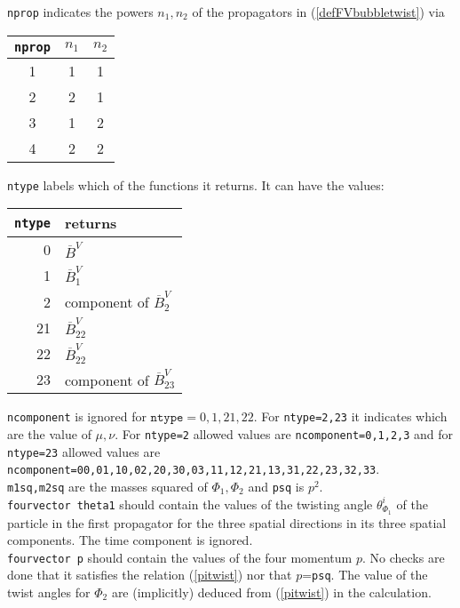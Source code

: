 \documentclass[12pt,a4paper]{article}
\newcommand{\mytt}[1]{\texttt{#1}}
\begin{document}
\mytt{nprop} indicates the powers $n_1,n_2$ of the propagators
in (\ref{defFVbubbletwist}) via
\begin{center}
\begin{tabular}{|ccc|}
\hline
\mytt{nprop} & $n_1$ & $n_2$\\
\hline
 1 & 1 & 1\\
 2 & 2 & 1\\
 3 & 1 & 2\\
 4 & 2 & 2\\
\hline
\end{tabular}
\end{center}
\mytt{ntype} labels which of the functions it returns.
It can have the values:\\
\begin{center}
\begin{tabular}{|rl|}
\hline
\mytt{ntype} & returns \\
\hline
0 & $\overline B^V$ \\
1 & $\overline B^V_1$ \\
2 & component of $\overline B^V_2$ \\
21 & $\overline B^V_{22}$ \\
22 & $\overline B^V_{22}$ \\
23 & component of $\overline B^V_{23}$ \\
\hline
\end{tabular}
\end{center}
\mytt{ncomponent} is ignored for $\mytt{ntype}=0,1,21,22$. For
\mytt{ntype=2,23} it indicates which are the value of $\mu,\nu$.
For \mytt{ntype=2} allowed values are \mytt{ncomponent=0,1,2,3}
and for  \mytt{ntype=23} allowed values are
\mytt{ncomponent=00,01,10,02,20,30,03,11,12,21,13,31,22,23,32,33}.\\
\mytt{m1sq,m2sq} are the masses squared of $\Phi_1,\Phi_2$
and \mytt{psq} is $p^2$.\\
\mytt{fourvector theta1} should contain the values
of the twisting angle $\theta^i_{\Phi_1}$ of the particle in the first
propagator for the three spatial directions in its three spatial components. The time component is ignored.\\
\mytt{fourvector p} should contain the values
of the four momentum $p$.
No checks are done that it satisfies the relation (\ref{pitwist})
nor that $p$=\mytt{psq}. The value of the twist angles for $\Phi_2$
are (implicitly) deduced from (\ref{pitwist}) in the calculation.
\end{document}
